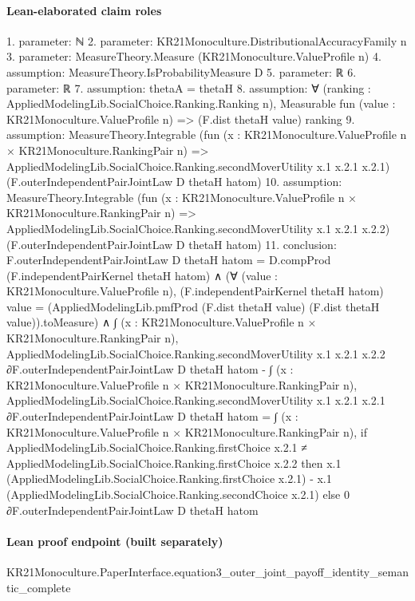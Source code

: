 \documentclass[10pt]{article}
\begin{document}
\paragraph{Lean-elaborated claim roles}\begin{ReviewVerbatim}
1. parameter: ℕ
2. parameter: KR21Monoculture.DistributionalAccuracyFamily n
3. parameter: MeasureTheory.Measure (KR21Monoculture.ValueProfile n)
4. assumption: MeasureTheory.IsProbabilityMeasure D
5. parameter: ℝ
6. parameter: ℝ
7. assumption: thetaA = thetaH
8. assumption: ∀ (ranking : AppliedModelingLib.SocialChoice.Ranking.Ranking n),
  Measurable fun (value : KR21Monoculture.ValueProfile n) => (F.dist thetaH value) ranking
9. assumption: MeasureTheory.Integrable
  (fun (x : KR21Monoculture.ValueProfile n × KR21Monoculture.RankingPair n) =>
    AppliedModelingLib.SocialChoice.Ranking.secondMoverUtility x.1 x.2.1 x.2.1)
  (F.outerIndependentPairJointLaw D thetaH hatom)
10. assumption: MeasureTheory.Integrable
  (fun (x : KR21Monoculture.ValueProfile n × KR21Monoculture.RankingPair n) =>
    AppliedModelingLib.SocialChoice.Ranking.secondMoverUtility x.1 x.2.1 x.2.2)
  (F.outerIndependentPairJointLaw D thetaH hatom)
11. conclusion: F.outerIndependentPairJointLaw D thetaH hatom = D.compProd (F.independentPairKernel thetaH hatom) ∧
  (∀ (value : KR21Monoculture.ValueProfile n),
      (F.independentPairKernel thetaH hatom) value =
        (AppliedModelingLib.pmfProd (F.dist thetaH value) (F.dist thetaH value)).toMeasure) ∧
    ∫ (x : KR21Monoculture.ValueProfile n × KR21Monoculture.RankingPair n),
          AppliedModelingLib.SocialChoice.Ranking.secondMoverUtility x.1 x.2.1
            x.2.2 ∂F.outerIndependentPairJointLaw D thetaH hatom -
        ∫ (x : KR21Monoculture.ValueProfile n × KR21Monoculture.RankingPair n),
          AppliedModelingLib.SocialChoice.Ranking.secondMoverUtility x.1 x.2.1
            x.2.1 ∂F.outerIndependentPairJointLaw D thetaH hatom =
      ∫ (x : KR21Monoculture.ValueProfile n × KR21Monoculture.RankingPair n),
        if
            AppliedModelingLib.SocialChoice.Ranking.firstChoice x.2.1 ≠
              AppliedModelingLib.SocialChoice.Ranking.firstChoice x.2.2 then
          x.1 (AppliedModelingLib.SocialChoice.Ranking.firstChoice x.2.1) -
            x.1 (AppliedModelingLib.SocialChoice.Ranking.secondChoice x.2.1)
        else 0 ∂F.outerIndependentPairJointLaw D thetaH hatom
\end{ReviewVerbatim}

\paragraph{Lean proof endpoint (built separately)}\begin{ReviewVerbatim}
KR21Monoculture.PaperInterface.equation3_outer_joint_payoff_identity_semantic_complete
\end{ReviewVerbatim}
\end{document}
